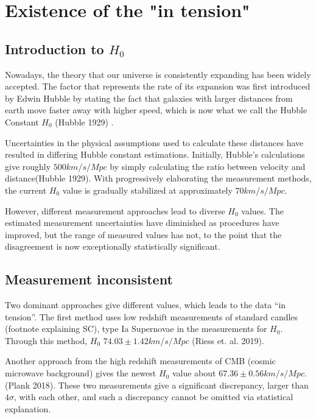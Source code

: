 \section{Existence of the "in tension"} \label{sec:outline}
\subsection{\label{sec:level2}Introduction to $H_0$}
Nowadays, the theory that our universe is consistently expanding has been widely accepted. The factor that represents the rate of its expansion was first introduced by Edwin Hubble by stating the fact that galaxies with larger distances from earth move faster away with higher speed, which is now what we call the Hubble Constant $H_0$ (Hubble 1929) \cite{Hubble_1929}. 

 Uncertainties in the physical assumptions used to calculate these distances have resulted in differing Hubble constant estimations. Initially, Hubble’s calculations give roughly $500 km/s/Mpc$ by simply calculating the ratio between velocity and distance(Hubble 1929)\cite{Hubble_1929}. With progressively elaborating the measurement methods, the current $H_0$ value is gradually stabilized at approximately $70 km/s/Mpc$. 

However, different measurement approaches lead to diverse $H_0$ values. The estimated measurement uncertainties have diminished as procedures have improved, but the range of measured values has not, to the point that the disagreement is now exceptionally statistically significant.


\subsection{\label{sec:level2}Measurement inconsistent}
Two dominant approaches give different values, which leads to the data “in tension”. The first method uses low redshift measurements of standard candles (footnote explaining SC), type Ia Supernovae in the measurements for $H_0$. Through this method, $H_0$  $74.03 \pm 1.42 km/s/Mpc$  (Riess et. al. 2019).

Another approach from the high redshift measurements of CMB (cosmic microwave background) gives the newest $H_0$ value about $67.36 \pm 0.56km/s/Mpc$. (Plank 2018). These two measurements give a significant discrepancy, larger than $4 \sigma$, with each other, and such a discrepancy cannot be omitted via statistical explanation.


